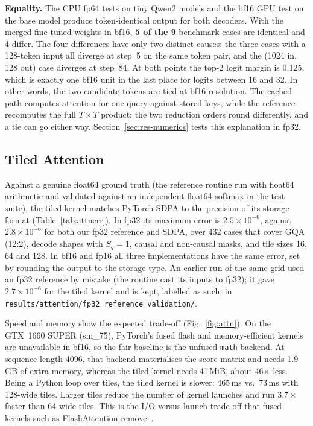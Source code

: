 \textbf{Equality.} The CPU fp64 tests on tiny Qwen2 models and the bf16 GPU test on the base model produce
token-identical output for both decoders. With the merged fine-tuned weights in bf16, \textbf{5 of the 9}
benchmark cases are identical and 4 differ. The four differences have only two distinct causes: the three
cases with a 128-token input all diverge at step~5 on the same token pair, and the (1024 in, 128 out) case
diverges at step~84. At both points the top-2 logit margin is 0.125, which is exactly
one bf16 unit in the last place for logits between 16 and 32. In other words, the two candidate tokens are
tied at bf16 resolution. The cached path computes attention for one query against stored keys, while the
reference recomputes the full $T\times T$ product; the two reduction orders round differently, and a tie can
go either way. Section~\ref{sec:res-numerics} tests this explanation in fp32.

\subsection{Tiled Attention}

Against a genuine float64 ground truth (the reference routine run with float64 arithmetic and validated against
an independent float64 softmax in the test suite), the tiled kernel matches PyTorch SDPA to the precision of its
storage format (Table~\ref{tab:attnerr}). In fp32 its maximum error is $2.5\times10^{-6}$, against
$2.8\times10^{-6}$ for both our fp32 reference and SDPA, over 432 cases that cover GQA (12:2), decode shapes with
$S_q{=}1$, causal and non-causal masks, and tile sizes 16, 64 and 128. In bf16 and fp16 all three implementations
have the same error, set by rounding the output to the storage type. An earlier run of the same grid used an
fp32 reference by mistake (the routine cast its inputs to fp32); it gave $2.7\times10^{-6}$ for the tiled kernel
and is kept, labelled as such, in \texttt{results/attention/fp32\_reference\_validation/}.

Speed and memory show the expected trade-off (Fig.~\ref{fig:attn}). On the GTX~1660 SUPER (sm\_75), PyTorch's
fused flash and memory-efficient kernels are unavailable in bf16, so the fair baseline is the unfused
\texttt{math} backend. At sequence length 4096, that backend materialises the score matrix and needs 1.9\,GB of
extra memory, whereas the tiled kernel needs 41\,MiB, about 46$\times$ less. Being a Python loop over tiles, the
tiled kernel is slower: 465\,ms vs.\ 73\,ms with 128-wide tiles. Larger tiles reduce the number of kernel
launches and run $3.7\times$ faster than 64-wide tiles. This is the I/O-versus-launch trade-off that fused
kernels such as FlashAttention remove~\cite{dao2022flashattention}.

